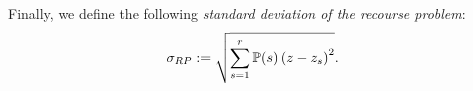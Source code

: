 Finally, we define the following \textit{standard deviation of the recourse problem}:
\begin{align} 
\sigma_{RP}&:=\sqrt{\sum_{s=1}^{r}\operatorname*{\mathbb{P}}(s)\left(z-z_s\right)^2}. \label{sd}
\end{align}
%
%
%
%



